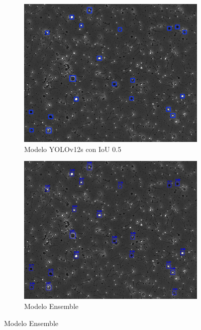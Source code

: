 \documentclass[12pt,a4paper,onecolumn,oneside]{report}
\begin{document}
\begin{figure}[H]
  \vspace{0.3cm} 
  
  \begin{subfigure}[b]{0.48\textwidth}
    \centering
    \includegraphics[width=\textwidth]{figuras/evaluacion_cualitativa/461/461_v12.jpg}
    \caption{Modelo YOLOv12s con IoU 0.5}
    \label{fig:yolov12s_IoU0.5_image_461}
  \end{subfigure}
  \hfill
  \begin{subfigure}[b]{0.48\textwidth}
    \centering
    \includegraphics[width=\textwidth]{figuras/evaluacion_cualitativa/461/461_ensemble.jpg}
    \caption{Modelo Ensemble}
    \label{fig:ensemble_image_461}
  \end{subfigure}


\end{figure}
\end{document}
